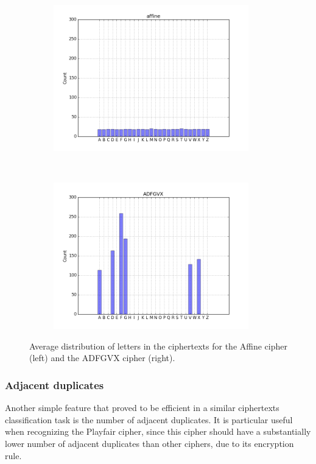 \documentclass[a4paper]{article}
\begin{document}
\begin{figure}[H]
    \centering
    \begin{subfigure}[h]{0.5\textwidth}
    		\centering
        \includegraphics[height=2.5in]{img/affine_dist.png}
    \end{subfigure}%
    ~
    \begin{subfigure}[h]{0.5\textwidth}
	    \centering
        \includegraphics[height=2.5in]{img/adfgvx_dist.png}
    \end{subfigure}
    \caption{Average distribution of letters in the ciphertexts for the Affine cipher (left) and the ADFGVX cipher (right).}
    \label{fig:letter_dist}
\end{figure}

\subsubsection{Adjacent duplicates}
Another simple feature that proved to be efficient in a similar ciphertexts classification task \cite{sivagurunathan2010classification} is the number of adjacent duplicates. It is particular useful when recognizing the Playfair cipher, since this cipher should have a substantially lower number of adjacent duplicates than other ciphers, due to its encryption rule.
\end{document}
